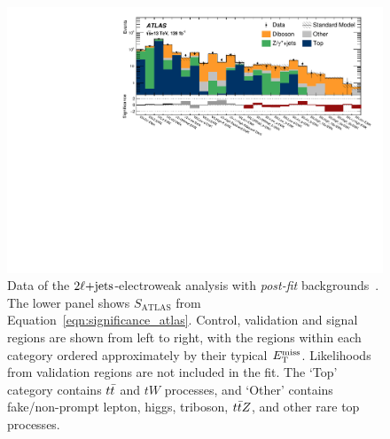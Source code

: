 \begin{figure}[tp]
\centering
\includegraphics[width=\textwidth]{figures/2ljets_summary_log.pdf}
\caption{%
Data of the $2\ell\mathrm{+jets}$-electroweak analysis with \emph{post-fit}
backgrounds~\cite{atlas2022searches}.
The lower panel shows $S_\mathrm{ATLAS}$ from
Equation~\ref{eqn:significance_atlas}.
Control, validation and signal regions are shown from left to right, with the
regions within each category ordered approximately by their typical $E_\mathrm{T}^\mathrm{miss}$.
Likelihoods from validation regions are not included in the fit.
The `Top' category contains $t\bar t$ and $tW$ processes, and
`Other' contains fake/non-prompt lepton, higgs, triboson, $t\bar t Z$, and other
rare top processes.%
}
\label{fig:2ljets_summary}
\end{figure}



